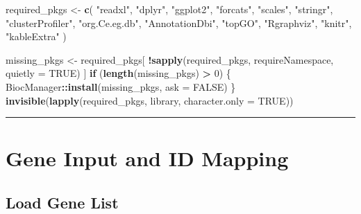 \documentclass[
  11pt,
]{article}
\newenvironment{Shaded}{\begin{snugshade}}{\end{snugshade}}
\newcommand{\AttributeTok}[1]{\textcolor[rgb]{0.13,0.29,0.53}{#1}}
\newcommand{\ConstantTok}[1]{\textcolor[rgb]{0.56,0.35,0.01}{#1}}
\newcommand{\ControlFlowTok}[1]{\textcolor[rgb]{0.13,0.29,0.53}{\textbf{#1}}}
\newcommand{\DecValTok}[1]{\textcolor[rgb]{0.00,0.00,0.81}{#1}}
\newcommand{\FunctionTok}[1]{\textcolor[rgb]{0.13,0.29,0.53}{\textbf{#1}}}
\newcommand{\NormalTok}[1]{#1}
\newcommand{\OtherTok}[1]{\textcolor[rgb]{0.56,0.35,0.01}{#1}}
\newcommand{\SpecialCharTok}[1]{\textcolor[rgb]{0.81,0.36,0.00}{\textbf{#1}}}
\newcommand{\StringTok}[1]{\textcolor[rgb]{0.31,0.60,0.02}{#1}}
\begin{document}
\begin{Shaded}
\begin{Highlighting}[]
\NormalTok{required\_pkgs }\OtherTok{\textless{}{-}} \FunctionTok{c}\NormalTok{(}
  \StringTok{"readxl"}\NormalTok{, }\StringTok{"dplyr"}\NormalTok{, }\StringTok{"ggplot2"}\NormalTok{, }\StringTok{"forcats"}\NormalTok{, }\StringTok{"scales"}\NormalTok{, }\StringTok{"stringr"}\NormalTok{,}
  \StringTok{"clusterProfiler"}\NormalTok{, }\StringTok{"org.Ce.eg.db"}\NormalTok{, }\StringTok{"AnnotationDbi"}\NormalTok{,}
  \StringTok{"topGO"}\NormalTok{, }\StringTok{"Rgraphviz"}\NormalTok{, }\StringTok{"knitr"}\NormalTok{, }\StringTok{"kableExtra"}
\NormalTok{)}

\NormalTok{missing\_pkgs }\OtherTok{\textless{}{-}}\NormalTok{ required\_pkgs[}
  \SpecialCharTok{!}\FunctionTok{sapply}\NormalTok{(required\_pkgs, requireNamespace, }\AttributeTok{quietly =} \ConstantTok{TRUE}\NormalTok{)}
\NormalTok{]}
\ControlFlowTok{if}\NormalTok{ (}\FunctionTok{length}\NormalTok{(missing\_pkgs) }\SpecialCharTok{\textgreater{}} \DecValTok{0}\NormalTok{) \{}
\NormalTok{  BiocManager}\SpecialCharTok{::}\FunctionTok{install}\NormalTok{(missing\_pkgs, }\AttributeTok{ask =} \ConstantTok{FALSE}\NormalTok{)}
\NormalTok{\}}
\FunctionTok{invisible}\NormalTok{(}\FunctionTok{lapply}\NormalTok{(required\_pkgs, library, }\AttributeTok{character.only =} \ConstantTok{TRUE}\NormalTok{))}
\end{Highlighting}
\end{Shaded}

\begin{center}\rule{0.5\linewidth}{0.5pt}\end{center}

\section{Gene Input and ID Mapping}\label{gene-input-and-id-mapping}

\subsection{Load Gene List}\label{load-gene-list}
\end{document}

